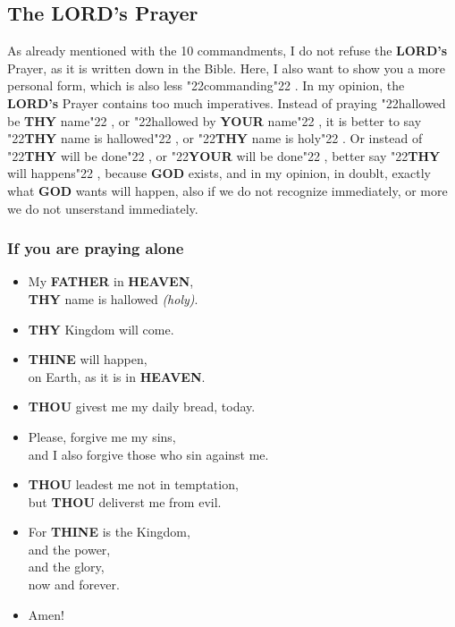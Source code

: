 \documentclass[10pt,a5paper]{article}
\newcommand{\God}[0]{\textbf{GOD}}
\newcommand{\Father}[0]{\textbf{FATHER}}
\newcommand{\Heaven}[0]{\textbf{HEAVEN}}
\newcommand{\Lords}[0]{\textbf{LORD's}}
\newcommand{\Thine}[0]{\textbf{THINE}}
\newcommand{\Thou}[0]{\textbf{THOU}}
\newcommand{\Thy}[0]{\textbf{THY}}
\newcommand{\Your}[0]{\textbf{YOUR}}
\newcommand{\q}[1]{\char"22{#1}\char"22 }
\begin{document}
	\subsection{The {\Lords} Prayer}
		As already mentioned with the 10 commandments,
		I do not refuse the {\Lords} Prayer,
		as it is written down in the Bible.
		Here,
		I also want to show you a more personal form,
		which is also less \q{commanding}.
		In my opinion,
		the {\Lords} Prayer contains too much imperatives.
		Instead of praying \q{hallowed be {\Thy} name},
		or \q{hallowed by {\Your} name},
		it is better to say \q{{\Thy} name is hallowed},
		or \q{{\Thy} name is holy}.
		Or instead of \q{{\Thy} will be done},
		or \q{{\Your} will be done},
		better say \q{{\Thy} will happens},
		because {\God} exists,
		and in my opinion,
		in doublt,
		exactly what {\God} wants will happen,
		also if we do not recognize immediately,
		or more we do not unserstand immediately.

	\subsubsection{If you are praying alone}
		\begin{itemize}[nosep]
			\item	My {\Father} in {\Heaven},
					\\
					{\Thy} name is hallowed \textit{(holy)}.
			\item	{\Thy} Kingdom will come.
			\item	{\Thine} will happen,
					\\
					on Earth,
					as it is in {\Heaven}.
			\item	{\Thou} givest me my daily bread,
					today.
			\item	Please,
					forgive me my sins,
					\\
					and I also forgive those who sin against me.
			\item	{\Thou} leadest me not in temptation,
					\\
					but {\Thou} deliverst me from evil.
			\item	For {\Thine} is the Kingdom,
					\\
					and the power,
					\\
					and the glory,
					\\
					now and forever.
			\item	Amen!
	\end{itemize}
	
\end{document}
